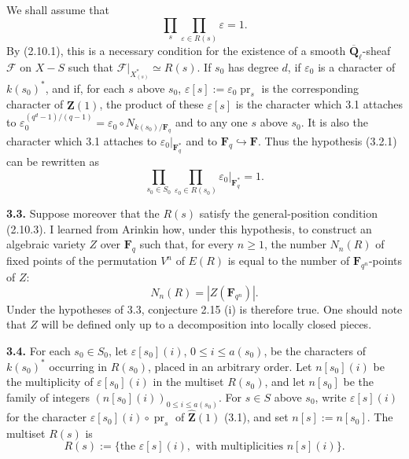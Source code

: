 \documentclass[11pt]{article}
\newcommand{\Fq}{\mathbf{F}_q}
\newcommand{\Fqn}{\mathbf{F}_{q^n}}
\newcommand{\F}{\mathbf{F}}
\newcommand{\Qbl}{\overline{\mathbf{Q}}_{\ell}}
\newcommand{\Zhat}{\widehat{\mathbf{Z}}}
\newcommand{\Fcal}{\mathcal{F}}
\newcommand{\para}[1]{\medskip\noindent\textbf{#1}\enspace}
\begin{document}
We shall assume that
\begin{equation}
  \prod_s\prod_{\varepsilon\in R(s)}\varepsilon=1.
\tag{3.2.1}
\end{equation}
By (2.10.1), this is a necessary condition for the existence of a smooth \(\Qbl\)-sheaf \(\Fcal\) on \(X-S\) such that \(\Fcal|_{X_{(s)}^*}\simeq R(s)\). If \(s_0\) has degree \(d\), if \(\varepsilon_0\) is a character of \(k(s_0)^*\), and if, for each \(s\) above \(s_0\), \(\varepsilon[s]:=\varepsilon_0\operatorname{pr}_s\) is the corresponding character of \(\Zhat(1)\), the product of these \(\varepsilon[s]\) is the character which 3.1 attaches to \(\varepsilon_0^{(q^d-1)/(q-1)}=\varepsilon_0\circ N_{k(s_0)/\Fq}\) and to any one \(s\) above \(s_0\). It is also the character which 3.1 attaches to \(\varepsilon_0|_{\Fq^*}\) and to \(\Fq\hookrightarrow\F\). Thus the hypothesis (3.2.1) can be rewritten as
\begin{equation}
  \prod_{s_0\in S_0}\prod_{\varepsilon_0\in R(s_0)}\varepsilon_0|_{\Fq^*}=1.
\tag{3.2.2}
\end{equation}

\para{3.3.} Suppose moreover that the \(R(s)\) satisfy the general-position condition (2.10.3). I learned from Arinkin how, under this hypothesis, to construct an algebraic variety \(Z\) over \(\Fq\) such that, for every \(n\geq1\), the number \(N_n(R)\) of fixed points of the permutation \(V^n\) of \(E(R)\) is equal to the number of \(\Fqn\)-points of \(Z\):
\begin{equation}
  N_n(R)=|Z(\Fqn)|.
\tag{3.3.1}
\end{equation}
Under the hypotheses of 3.3, conjecture 2.15 (i) is therefore true. One should note that \(Z\) will be defined only up to a decomposition into locally closed pieces.

\para{3.4.} For each \(s_0\in S_0\), let \(\varepsilon[s_0](i)\), \(0\leq i\leq a(s_0)\), be the characters of \(k(s_0)^*\) occurring in \(R(s_0)\), placed in an arbitrary order. Let \(n[s_0](i)\) be the multiplicity of \(\varepsilon[s_0](i)\) in the multiset \(R(s_0)\), and let \(n[s_0]\) be the family of integers \((n[s_0](i))_{0\leq i\leq a(s_0)}\). For \(s\in S\) above \(s_0\), write \(\varepsilon[s](i)\) for the character \(\varepsilon[s_0](i)\circ\operatorname{pr}_s\) of \(\Zhat(1)\) (3.1), and set \(n[s]:=n[s_0]\). The multiset \(R(s)\) is
\begin{equation}
  R(s):=\{\text{the }\varepsilon[s](i),\text{ with multiplicities }n[s](i)\}.
\tag{3.4.1}
\end{equation}
\end{document}
